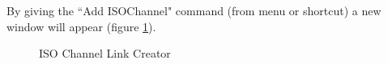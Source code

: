By giving the ``Add ISOChannel" command (from menu or shortcut) a new window will appear (figure \ref{fig:ISOCH_new_link}).

\begin{figure}[h]
\centering
	\caption{ISO Channel Link Creator}
	\label{fig:ISOCH_new_link}
\end{figure}


